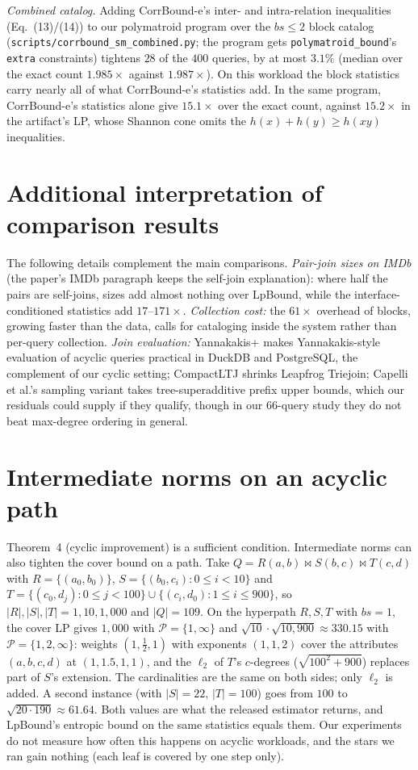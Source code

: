 \documentclass[11pt]{article}
\begin{document}
\emph{Combined catalog.} Adding CorrBound-e's inter- and intra-relation
inequalities (Eq.~(13)/(14)) to our polymatroid program over the
$bs{\le}2$ block catalog (\texttt{scripts/corrbound\_sm\_combined.py}; the
program gets \texttt{polymatroid\_bound}'s \texttt{extra} constraints)
tightens $28$ of the $400$ queries, by at most $3.1\%$ (median over the
exact count $1.985\times$ against $1.987\times$). On this workload the
block statistics carry nearly all of what CorrBound-e's statistics add. In the same
program, CorrBound-e's statistics alone give $15.1\times$ over the exact
count, against $15.2\times$ in the artifact's LP, whose Shannon cone omits
the $h(x)+h(y)\ge h(xy)$ inequalities.

\section{Additional interpretation of comparison results}
The following details complement the main comparisons. \emph{Pair-join sizes on IMDb} (the paper's IMDb paragraph keeps the self-join explanation): where half the
pairs are self-joins, sizes add almost nothing over LpBound, while the
interface-conditioned statistics add $17$--$171\times$. \emph{Collection cost:} the
$61\times$ overhead of blocks, growing faster than the data, calls for
cataloging inside the system rather than per-query collection.
\emph{Join evaluation:} Yannakakis+ makes Yannakakis-style evaluation of
acyclic queries practical in DuckDB and PostgreSQL, the complement of our
cyclic setting; CompactLTJ shrinks Leapfrog Triejoin; Capelli et al.'s
sampling variant takes tree-superadditive prefix upper bounds, which our
residuals could supply if they qualify, though in our $66$-query study they
do not beat max-degree ordering in general.

\section{Intermediate norms on an acyclic path}
Theorem~4 (cyclic improvement) is a sufficient condition. Intermediate norms
can also tighten the cover bound on a path. Take
$Q = R(a,b)\bowtie S(b,c)\bowtie T(c,d)$ with $R=\{(a_0,b_0)\}$,
$S=\{(b_0,c_i) : 0\le i<10\}$ and
$T=\{(c_0,d_j) : 0\le j<100\}\cup\{(c_i,d_0) : 1\le i\le 900\}$, so
$|R|,|S|,|T| = 1, 10, 1{,}000$ and $|Q| = 109$. On the hyperpath
$R,S,T$ with $bs{=}1$, the cover LP gives $1{,}000$ with
$\mathcal{P}=\{1,\infty\}$ and $\sqrt{10}\cdot\sqrt{10{,}900}\approx 330.15$
with $\mathcal{P}=\{1,2,\infty\}$: weights $(1,\tfrac12,1)$ with exponents
$(1,1,2)$ cover the attributes $(a,b,c,d)$ at $(1,1.5,1,1)$, and the
$\ell_2$ of $T$'s $c$-degrees ($\sqrt{100^2+900}$) replaces part of $S$'s
extension. The cardinalities are the same on both sides; only $\ell_2$ is
added. A second instance (with $|S|=22$, $|T|=100$) goes from $100$ to
$\sqrt{20\cdot 190}\approx 61.64$. Both values are what the released
estimator returns, and LpBound's entropic bound on the same statistics
equals them. Our experiments do not measure how often this happens on
acyclic workloads, and the stars we ran gain nothing (each leaf is covered
by one step only).
\end{document}
